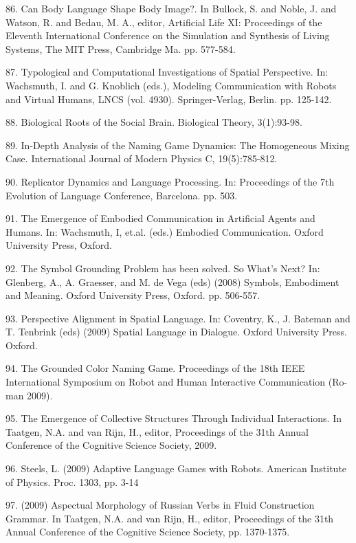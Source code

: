 86. \citet{Steels:08d} Can Body Language Shape Body Image?. In Bullock, S. and Noble, J. and Watson, R. and 
Bedau, M. A., editor, Artificial Life XI: Proceedings of the Eleventh International Conference on the Simulation and 
Synthesis of Living Systems, The MIT Press, Cambridge Ma. pp. 577-584. 

87. \citet{Loetzsch:08e}  Typological and Computational Investigations of Spatial Perspective. In: Wachsmuth, I. 
and G. Knoblich (eds.), Modeling Communication with Robots and Virtual Humans, LNCS (vol. 4930). Springer-Verlag, Berlin. pp. 125-142. 

88. \citet{Steels:08f} Biological Roots of the Social Brain. Biological Theory, 3(1):93-98. 

89. \citet{Baronchelli:08g} In-Depth Analysis of the Naming Game Dynamics: The Homogeneous Mixing Case. International Journal of Modern Physics C, 19(5):785-812. 

90. \citet{Steels:08h}
Replicator Dynamics and Language Processing. In: Proceedings of the 7th Evolution of Language Conference, Barcelona. pp. 503. 

91. \citet{Galantucci:08i} The Emergence of Embodied Communication in Artificial Agents and Humans. In: Wachsmuth, I, et.al. (eds.) Embodied Communication. Oxford University Press, Oxford. 

92. \citet{Steels:08j} The Symbol Grounding Problem has been solved. So What's Next? In: Glenberg, A., A. Graesser, and M. de Vega (eds) (2008) Symbols, Embodiment and Meaning. Oxford University Press, Oxford. pp. 506-557. 

93. \citet{Steels:09a} Perspective Alignment in Spatial Language. In: Coventry, K., J. Bateman and T. Tenbrink (eds) (2009) Spatial Language in Dialogue. Oxford University Press. Oxford. 

94. \citet{Bleys:09b} The Grounded Color Naming Game. Proceedings of the 18th IEEE International Symposium on Robot and Human Interactive Communication (Ro-man 2009). 

95. \citet{Goldstone:09c} The Emergence of Collective Structures Through Individual Interactions. In Taatgen, N.A. and van Rijn, H., editor, Proceedings of the 31th Annual Conference of the Cognitive Science Society, 2009.

96. \citet{Steels:09d}
Steels, L. (2009) Adaptive Language Games with Robots. American Institute of Physics. Proc. 1303, pp. 3-14

97. \citet{Gerasymova:09e} (2009) Aspectual Morphology of Russian Verbs in Fluid Construction Grammar. In Taatgen, N.A. and van Rijn, H., editor, Proceedings of the 31th Annual Conference of the Cognitive Science Society, pp. 1370-1375. 


